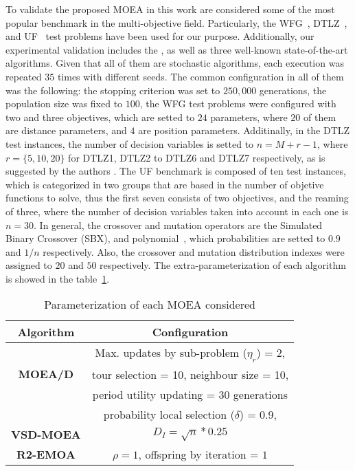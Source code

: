 %
To validate the proposed MOEA in this work are considered some of the most popular benchmark in the multi-objective field.
%
Particularly, the WFG~\cite{Joel:WFG}, DTLZ~\cite{Joel:DTLZ}, and UF~\cite{Joel:CEC2009} test problems have been used for our purpose. 
%
Additionally, our experimental validation includes the \VSDMOEA{}, as well as three well-known state-of-the-art algorithms.
%
Given that all of them are stochastic algorithms, each execution was repeated $35$ times with different seeds.
%
The common configuration in all of them was the following: the stopping criterion was set to $250,000$ generations, the population size was fixed to $100$, the WFG test problems were configured with two and three objectives, which are setted to $24$ parameters, where $20$ of them are distance parameters, and $4$ are position parameters.
%
Additinally, in the DTLZ test instances, the number of decision variables is setted to $n=M+r-1$, where $r=\{5, 10, 20\}$ for DTLZ1, DTLZ2 to DTLZ6 and DTLZ7 respectively, as is suggested by the authors \cite{Joel:DTLZ}.  
% 
The UF benchmark is composed of ten test instances, which is categorized in two groups that are based in the number of objetive functions to solve, thus the first seven consists of two objectives, and the reaming of three, where the number of decision variables taken into account in each one is $n=30$.
%
In general, the crossover and mutation operators are the Simulated Binary Crossover (SBX), and polynomial~\cite{Joel:SBX1994, Joel:Mutation}, which probabilities are setted to $0.9$ and $1/n$ respectively.
%
Also, the crossover and mutation distribution indexes were assigned to $20$ and $50$ respectively.
%
The extra-parameterization of each algorithm is showed in the table~\ref{tab:Parametrization}.
%
\begin{table}[t]
\centering
\caption{Parameterization of each MOEA considered}
\label{tab:Parametrization}
\begin{tabular}{|c|c|}
\hline
\textbf{Algorithm} & \textbf{Configuration} \\ \hline
\multirow{3}{*}{\textbf{MOEA/D}} &Max. updates by sub-problem ($\eta_r$) = 2, \\
 & tour selection = 10,   neighbour size = 10, \\
 & period utility updating = 30 generations \\ 
 & probability local selection ($\delta$) = 0.9,\\ \hline
\textbf{VSD-MOEA} & $D_I=\sqrt{n}*0.25$ \\ \hline
\textbf{R2-EMOA} & $\rho=1$, offspring by iteration = $1$ \\ \hline
\end{tabular}
\end{table}


